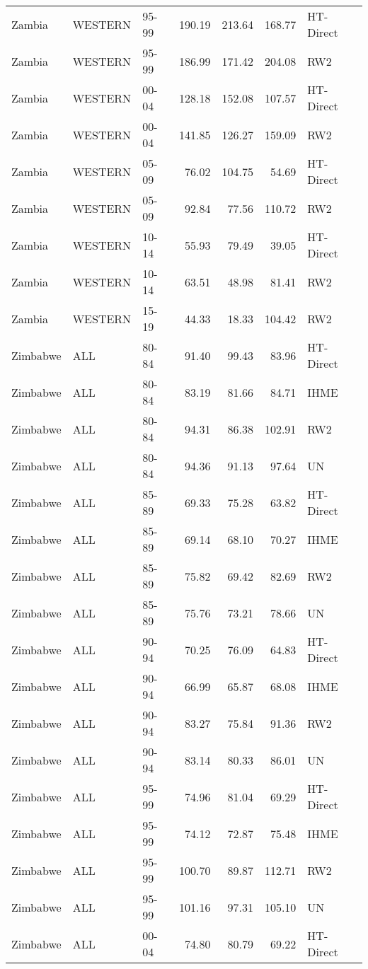\begin{longtable}{lllrrrl}
  Zambia & WESTERN & 95-99 & 190.19 & 213.64 & 168.77 & HT-Direct \\ 
  Zambia & WESTERN & 95-99 & 186.99 & 171.42 & 204.08 & RW2 \\ 
  Zambia & WESTERN & 00-04 & 128.18 & 152.08 & 107.57 & HT-Direct \\ 
  Zambia & WESTERN & 00-04 & 141.85 & 126.27 & 159.09 & RW2 \\ 
  Zambia & WESTERN & 05-09 & 76.02 & 104.75 & 54.69 & HT-Direct \\ 
  Zambia & WESTERN & 05-09 & 92.84 & 77.56 & 110.72 & RW2 \\ 
  Zambia & WESTERN & 10-14 & 55.93 & 79.49 & 39.05 & HT-Direct \\ 
  Zambia & WESTERN & 10-14 & 63.51 & 48.98 & 81.41 & RW2 \\ 
  Zambia & WESTERN & 15-19 & 44.33 & 18.33 & 104.42 & RW2 \\ 
  Zimbabwe & ALL & 80-84 & 91.40 & 99.43 & 83.96 & HT-Direct \\ 
  Zimbabwe & ALL & 80-84 & 83.19 & 81.66 & 84.71 & IHME \\ 
  Zimbabwe & ALL & 80-84 & 94.31 & 86.38 & 102.91 & RW2 \\ 
  Zimbabwe & ALL & 80-84 & 94.36 & 91.13 & 97.64 & UN \\ 
  Zimbabwe & ALL & 85-89 & 69.33 & 75.28 & 63.82 & HT-Direct \\ 
  Zimbabwe & ALL & 85-89 & 69.14 & 68.10 & 70.27 & IHME \\ 
  Zimbabwe & ALL & 85-89 & 75.82 & 69.42 & 82.69 & RW2 \\ 
  Zimbabwe & ALL & 85-89 & 75.76 & 73.21 & 78.66 & UN \\ 
  Zimbabwe & ALL & 90-94 & 70.25 & 76.09 & 64.83 & HT-Direct \\ 
  Zimbabwe & ALL & 90-94 & 66.99 & 65.87 & 68.08 & IHME \\ 
  Zimbabwe & ALL & 90-94 & 83.27 & 75.84 & 91.36 & RW2 \\ 
  Zimbabwe & ALL & 90-94 & 83.14 & 80.33 & 86.01 & UN \\ 
  Zimbabwe & ALL & 95-99 & 74.96 & 81.04 & 69.29 & HT-Direct \\ 
  Zimbabwe & ALL & 95-99 & 74.12 & 72.87 & 75.48 & IHME \\ 
  Zimbabwe & ALL & 95-99 & 100.70 & 89.87 & 112.71 & RW2 \\ 
  Zimbabwe & ALL & 95-99 & 101.16 & 97.31 & 105.10 & UN \\ 
  Zimbabwe & ALL & 00-04 & 74.80 & 80.79 & 69.22 & HT-Direct \\ 

\end{longtable}

